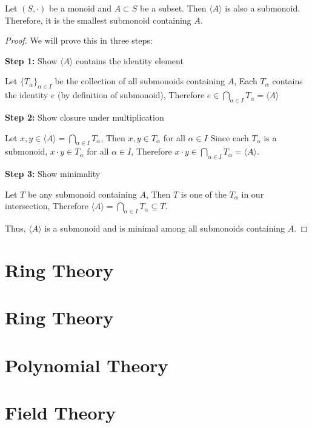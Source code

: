 \documentclass[11pt,lang=en]{elegantbook}
\begin{document}
\begin{proposition}
  Let $(S,\cdot)$ be a monoid and $A \subset S$ be a subset. Then $\langle A \rangle$ is also a submonoid. Therefore, it is the smallest submonoid containing $A$.
\end{proposition}
\begin{proof}
  We will prove this in three steps:

  \textbf{Step 1:} Show $\langle A \rangle$ contains the identity element 
  
  Let $\{T_\alpha\}_{\alpha \in I}$ be the collection of all submonoids containing $A$,
  Each $T_\alpha$ contains the identity $e$ (by definition of submonoid),
  Therefore $e \in \bigcap_{\alpha \in I} T_\alpha = \langle A \rangle$

  \textbf{Step 2:} Show closure under multiplication
  
     Let $x, y \in \langle A \rangle = \bigcap_{\alpha \in I} T_\alpha$,
     Then $x, y \in T_\alpha$ for all $\alpha \in I$
     Since each $T_\alpha$ is a submonoid, $x \cdot y \in T_\alpha$ for all $\alpha \in I$,
     Therefore $x \cdot y \in \bigcap_{\alpha \in I} T_\alpha = \langle A \rangle$.
  

  \textbf{Step 3:} Show minimality
 
     Let $T$ be any submonoid containing $A$,
     Then $T$ is one of the $T_\alpha$ in our intersection,
     Therefore $\langle A \rangle = \bigcap_{\alpha \in I} T_\alpha \subseteq T$.
 

  Thus, $\langle A \rangle$ is a submonoid and is minimal among all submonoids containing $A$.
\end{proof}

\chapter{Ring Theory}

\chapter{Ring Theory}

\chapter{Polynomial Theory}

\chapter{Field Theory}
\end{document}
